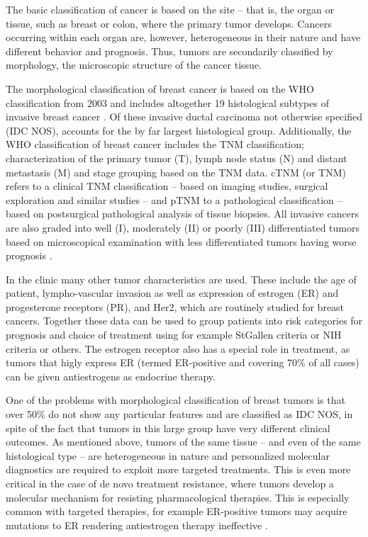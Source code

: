 The basic classification of cancer is based on the site -- that is, the organ
or tissue, such as breast or colon, where the primary tumor develops. Cancers
occurring within each organ are, however, heterogeneous in their nature and
have different behavior and prognosis. Thus, tumors are secondarily classified
by morphology, the microscopic structure of the cancer tissue.

The morphological classification of breast cancer is based on the WHO
classification from 2003 and includes altogether 19 histological subtypes of
invasive breast cancer \citep{Tavassoli2003,Weigelt2009}. Of these invasive
ductal carcinoma not otherwise specified (IDC NOS), accounts for the by far
largest histological group. Additionally, the WHO classification of
breast cancer includes the
TNM classification; characterization of the primary tumor (T), lymph node
status (N) and distant metastasis (M) and stage grouping based on the TNM
data. cTNM (or TNM) refers to a clinical TNM classification -- based on imaging studies,
surgical exploration and similar studies -- and pTNM to a pathological
classification -- based on postsurgical pathological analysis of tissue
biopsies. All invasive cancers are also graded into well (I), moderately (II)
or poorly (III) differentiated tumors based on microscopical examination
with less differentiated tumors having worse prognosis \citep{Tavassoli2003}.

In the clinic many other tumor characteristics are used. These
include the age of patient, lympho-vascular invasion as well as expression of
estrogen (ER) and progesterone receptors (PR), and Her2, which are routinely
studied for breast cancers. Together these data can be used to group patients
into risk categories for prognosis and choice of treatment using for example
StGallen criteria \citep{Goldhirsch2007} or NIH criteria \citep{Eifel2001} or others.
The estrogen receptor also has a special role in treatment, as tumors that higly express ER
(termed ER-positive and covering 70\% of all cases) can be given antiestrogens
as endocrine therapy.

One of the problems with morphological classification of breast tumors is that
over 50\% do not show any particular features and are classified as IDC NOS,
in spite of the fact that tumors in this large group have very different
clinical outcomes. As mentioned above, tumors of the same tissue -- and even
of the same histological type -- are heterogeneous in nature and personalized
molecular diagnostics are required to exploit more targeted treatments. This
is even more critical in the case of de novo treatment resistance, where
tumors develop a molecular mechanism for resisting pharmacological therapies.
This is especially common with targeted therapies, for example ER-positive
tumors may acquire mutations to ER rendering antiestrogen therapy ineffective
\citep{Oesterreich2013}.

